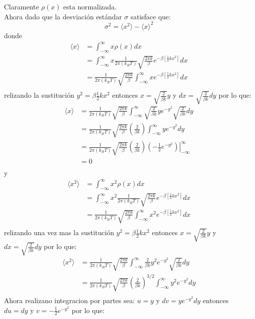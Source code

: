 \documentclass[a4paper]{article}
\begin{document}
\begin{answer}
        Claramente $\rho(x)$ esta normalizada.\\
        Ahora dado que la desviación estándar $\sigma$ satisface que:
        $$
        \sigma^2 =\langle x^2\rangle -\langle x\rangle^2
        $$
        donde
        \begin{align*}
            \langle x\rangle &= \int_{-\infty}^{\infty} x \rho(x) dx \\
            &= \int_{-\infty}^{\infty} x \frac{1}{2 \pi (k_B T)} \sqrt{\frac{2\pi k}{\beta}} e^{-\beta\left[\frac{1}{2} k x^2\right]} dx \\
            &= \frac{1}{2 \pi (k_B T)} \sqrt{\frac{2\pi k}{\beta}}  \int_{-\infty}^{\infty} x e^{-\beta\left[\frac{1}{2} k x^2\right]} dx \\
        \end{align*}
        relizando la sustitución $y^2 = \beta \frac{1}{2} k x^2$ entonces $x = \sqrt{\frac{2}{\beta k}} y$ y $dx = \sqrt{\frac{2}{\beta k}} dy$ por lo que:
        \begin{align*}
            \langle x\rangle &= \frac{1}{2 \pi (k_B T)} \sqrt{\frac{2\pi k}{\beta}}  \int_{-\infty}^{\infty} \sqrt{\frac{2}{\beta k}} y e^{-y^2} \sqrt{\frac{2}{\beta k}} dy \\
            &= \frac{1}{2 \pi (k_B T)} \sqrt{\frac{2\pi k}{\beta}}\left(
                \frac{2}{\beta k}
            \right)\int_{-\infty}^{\infty} y e^{-y^2} dy \\
            &= \frac{1}{2 \pi (k_B T)} \sqrt{\frac{2\pi k}{\beta}}\left(
                \frac{2}{\beta k}
            \right) \left.\left(-\frac{1}{2} e^{-y^2} \right)\right|_{-\infty}^{\infty} \\
            &= 0 \\
        \end{align*}
        y
        \begin{align*}
            \langle x^2\rangle &= \int_{-\infty}^{\infty} x^2 \rho(x) dx \\
            &= \int_{-\infty}^{\infty} x^2\frac{1}{2 \pi (k_B T)} \sqrt{\frac{2\pi k}{\beta}} e^{-\beta\left[\frac{1}{2} k x^2\right]}  dx \\
            &=\frac{1}{2 \pi (k_B T)} \sqrt{\frac{2\pi k}{\beta}} \int_{-\infty}^{\infty} x^2 e^{-\beta\left[\frac{1}{2} k x^2\right]} dx \\
        \end{align*}
        relizando una vez mas la sustitución $y^2 = \beta \frac{1}{2} k x^2$ entonces $x = \sqrt{\frac{2}{\beta k}} y$ y $dx = \sqrt{\frac{2}{\beta k}} dy$ por lo que:
        \begin{align*}
            \langle x^2\rangle &= \frac{1}{2 \pi (k_B T)} \sqrt{\frac{2\pi k}{\beta}}  \int_{-\infty}^{\infty} \frac{2}{\beta k} y^2 e^{-y^2} \sqrt{\frac{2}{\beta k}} dy \\
            &= \frac{1}{2 \pi (k_B T)} \sqrt{\frac{2\pi k}{\beta}} \left(\frac{2}{\beta k}\right)^{3/2}  \int_{-\infty}^{\infty} y^2 e^{-y^2} dy \\
        \end{align*}
        Ahora realizano integracion por partes sea: $u = y$ y $dv = y e^{-y^2} dy$ entonces $du = dy$ y $v = -\frac{1}{2} e^{-y^2}$ por lo que:
    

\end{answer}
\end{document}
